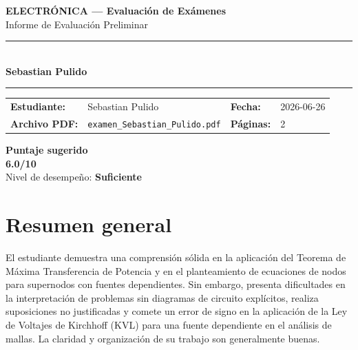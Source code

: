 \documentclass[11pt,a4paper]{article}
\begin{document}
\begin{center}
  {\Large\bfseries\color{azulTitulo} ELECTRÓNICA --- Evaluación de Exámenes}\\[4pt]
  {\large Informe de Evaluación Preliminar}\\[12pt]
  \rule{\linewidth}{1.2pt}\\[6pt]
  {\LARGE\bfseries Sebastian Pulido}\\[4pt]
  \rule{\linewidth}{0.6pt}
\end{center}

\vspace{4pt}
\begin{tcolorbox}[cajaTitulo, title=Datos del informe]
\begin{tabular}{@{}llll@{}}
  \textbf{Estudiante:}  & Sebastian Pulido  &
  \textbf{Fecha:}       & 2026-06-26 \\[4pt]
  \textbf{Archivo PDF:} & \texttt{examen\_Sebastian\_Pulido.pdf}  &
  \textbf{Páginas:}     & 2 \\
\end{tabular}
\end{tcolorbox}

\vspace{6pt}
\begin{center}
  \begin{tcolorbox}[
    enhanced,
    colback=white, colframe=desempeno_suficiente,
    width=0.62\linewidth,
    boxrule=2pt,
    halign=center, valign=center,
    top=8pt, bottom=8pt,
  ]
    \centering
    {\large\bfseries Puntaje sugerido}\\[6pt]
    {\Huge\bfseries\color{desempeno_suficiente} 6.0/10}\\[6pt]
    {\large Nivel de desempeño: \textbf{\color{desempeno_suficiente} Suficiente}}
  \end{tcolorbox}
\end{center}

\section*{Resumen general}
El estudiante demuestra una comprensión sólida en la aplicación del Teorema de Máxima Transferencia de Potencia y en el planteamiento de ecuaciones de nodos para supernodos con fuentes dependientes. Sin embargo, presenta dificultades en la interpretación de problemas sin diagramas de circuito explícitos, realiza suposiciones no justificadas y comete un error de signo en la aplicación de la Ley de Voltajes de Kirchhoff (KVL) para una fuente dependiente en el análisis de mallas. La claridad y organización de su trabajo son generalmente buenas.
\end{document}
